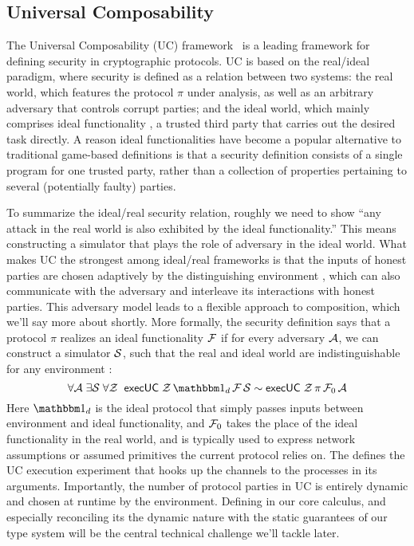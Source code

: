 \subsection{Universal Composability}
The Universal Composability (UC) framework~\cite{uc} is a leading framework for defining security in cryptographic protocols.
UC is based on the real/ideal paradigm, where security is defined as a relation between two systems: the real world, which features the protocol $\pi$ under analysis, as well as an arbitrary adversary \A that controls corrupt parties; and the ideal world, which mainly comprises ideal functionality \F, a trusted third party that carries out the desired task directly.
A reason ideal functionalities have become a popular alternative to traditional game-based definitions is that a security definition consists of a single program for one trusted party, rather than a collection of properties pertaining to several (potentially faulty) parties.

To summarize the ideal/real security relation, roughly we need to show ``any attack in the real world is also exhibited by the ideal functionality.'' This means constructing a simulator \Sim that plays the role of adversary in the ideal world.
What makes UC the strongest among ideal/real frameworks is that the inputs of honest parties are chosen adaptively by the distinguishing environment \Z, which can also communicate with the adversary and interleave its interactions with honest parties.
This adversary model leads to a flexible approach to composition, which we'll say more about shortly.
More formally, the security definition says that a protocol $\pi$ realizes an ideal functionality $\mathcal{F}$
if for every adversary $\mathcal{A}$, we can construct a simulator $\mathcal{S}$, such that the real and ideal world are indistinguishable for any environment \Z:
\begin{equation}
  \label{eqn:emulation}
  \forall \A \; \exists \Sim \; \forall \Z \; \; \msf{execUC} \; \Z \, \idealP \, \F \, \Sim \sim \msf{execUC} \; \Z \, \pi \, \F_0 \, \A
\end{equation}
Here $\idealP$ is the ideal protocol that simply passes inputs between environment and ideal functionality, and $\mathcal{F}_0$ takes the place of the ideal functionality in the real world, and is typically used to express network assumptions or assumed primitives the current protocol relies on.
The  defines the UC execution experiment that hooks up the channels to the processes in its arguments.
Importantly, the number of protocol parties in UC is entirely dynamic and chosen at runtime by the environment. 
Defining  in our core calculus, and especially reconciling its the dynamic nature with the static guarantees of our type system will be the central technical challenge we'll tackle later.

